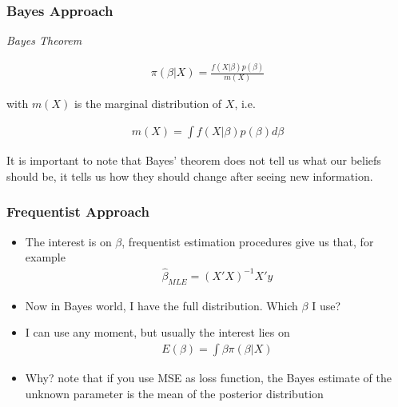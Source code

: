 \documentclass[
  shownotes,
  xcolor={svgnames},
  hyperref={colorlinks,citecolor=DarkBlue,linkcolor=DarkRed,urlcolor=DarkBlue}
  , aspectratio=169]{beamer}
\begin{document}
\begin{frame}[fragile]
\frametitle{Bayes Approach}
{\it Bayes Theorem}

\bigskip
\begin{align}
\pi (\beta|X)=\frac{f(X|\beta)p(\beta)}{m(X)}
\end{align}

\bigskip
with $m(X)$ is the marginal distribution of $X$, i.e.

\begin{align}
m(X)=\int f(X|\beta)p(\beta)d\beta
\end{align}

It is important to note that Bayes' theorem  does not tell us what our beliefs should be, it tells us how they should change after seeing new information.
\end{frame}


\begin{frame}[fragile]
\frametitle{Frequentist Approach}

\begin{itemize}
\item The interest is on $\beta$, frequentist estimation procedures give us that, for example
\medskip
\begin{align}
\hat{\beta}_{MLE}=(X'X)^{-1}X'y
\end{align}
\medskip

\item Now in Bayes world, I have the full distribution. Which $\beta$ I use?
\medskip
\item I can use any moment, but usually the interest lies on 
\begin{align}
E(\beta)=\int \beta \pi(\beta|X)
\end{align}

\item Why? note that if you use MSE as loss function, the Bayes estimate of the unknown parameter is  the mean of the posterior distribution
\end{itemize}




\end{frame}

\end{document}
